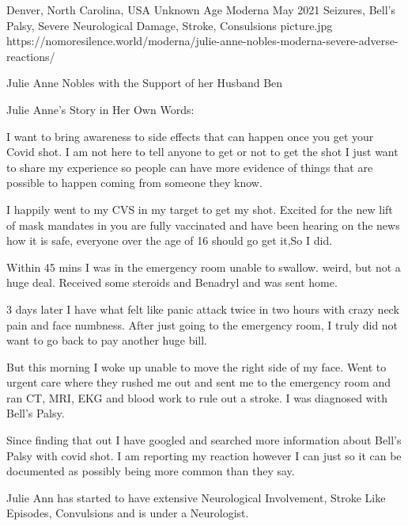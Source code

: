 {Denver, North Carolina, USA}
{Unknown Age}
{Moderna}
{May 2021}
{Seizures, Bell’s Palsy, Severe Neurological Damage, Stroke, Consulsions}
{picture.jpg}
{https://nomoresilence.world/moderna/julie-anne-nobles-moderna-severe-adverse-reactions/}
{



Julie Anne Nobles with the Support of her Husband Ben

Julie Anne’s Story in Her Own Words:

I want to bring awareness to side effects that can happen once you get your Covid shot. I am not here to tell anyone to get or not to get the shot I just want to share my experience so people can have more evidence of things that are possible to happen coming from someone they know.

I happily went to my CVS in my target to get my shot. Excited for the new lift of mask mandates in you are fully vaccinated and have been hearing on the news how it is safe, everyone over the age of 16 should go get it,So I did.

Within 45 mins I was in the emergency room unable to swallow. weird, but not a huge deal. Received some steroids and Benadryl and was sent home.

3 days later I have what felt like panic attack twice in two hours with crazy neck pain and face numbness. After just going to the emergency room, I truly did not want to go back to pay another huge bill.

But this morning I woke up unable to move the right side of my face. Went to urgent care where they rushed me out and sent me to the emergency room and ran CT, MRI, EKG and blood work to rule out a stroke. I was diagnosed with Bell’s Palsy.

Since finding that out I have googled and searched more information about Bell’s Palsy with covid shot. I am reporting my reaction however I can just so it can be documented as possibly being more common than they say.

Julie Ann has started to have extensive Neurological Involvement, Stroke Like Episodes, Convulsions and is under a Neurologist.
}
